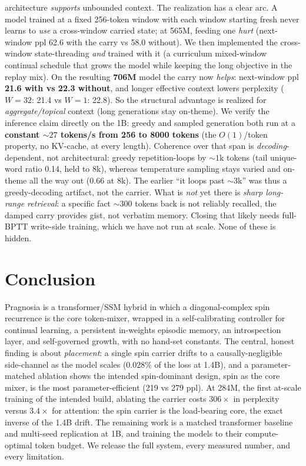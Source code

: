 \documentclass[11pt]{article}
\begin{document}
architecture \emph{supports} unbounded context. The realization has a clear arc. A model trained at a fixed 256-token window with each window starting fresh never learns to \emph{use} a cross-window carried state; at 565M, feeding one \emph{hurt} (next-window ppl 62.6 with the carry vs 58.0 without). We then implemented the cross-window state-threading \emph{and} trained with it (a curriculum mixed-window continual schedule that grows the model while keeping the long objective in the replay mix). On the resulting \textbf{706M} model the carry now \emph{helps}: next-window ppl \textbf{21.6 with vs 22.3 without}, and longer effective context lowers perplexity ($W{=}32$: 21.4 vs $W{=}1$: 22.8). So the structural advantage is realized for \emph{aggregate/topical} context (long generations stay on-theme). We verify the inference claim directly on the 1B: greedy and sampled generation both run at a \textbf{constant ${\sim}27$ tokens/s from 256 to 8000 tokens} (the $O(1)$/token property, no KV-cache, at every length). Coherence over that span is \emph{decoding}-dependent, not architectural: greedy repetition-loops by ${\sim}1$k tokens (tail unique-word ratio 0.14, held to 8k), whereas temperature sampling stays varied and on-theme all the way out (0.66 at 8k). The earlier ``it loops past ${\sim}3$k'' was thus a greedy-decoding artifact, not the carrier. What is \emph{not} yet there is \emph{sharp long-range retrieval}: a specific fact ${\sim}300$ tokens back is not reliably recalled, the damped carry provides gist, not verbatim memory. Closing that likely needs full-BPTT write-side training, which we have not run at scale. None of these is hidden.

\section{Conclusion}
Pragnosia is a transformer/SSM hybrid in which a diagonal-complex spin recurrence is the core token-mixer, wrapped in a self-calibrating controller for continual learning, a persistent in-weights episodic memory, an introspection layer, and self-governed growth, with no hand-set constants. The central, honest finding is about \emph{placement}: a single spin carrier drifts to a causally-negligible side-channel as the model scales (0.028\% of the loss at 1.4B), and a parameter-matched ablation shows the intended spin-dominant design, spin as the core mixer, is the most parameter-efficient (219 vs 279 ppl). At 284M, the first at-scale training of the intended build, ablating the carrier costs \textbf{$306\times$} in perplexity versus $3.4\times$ for attention: the spin carrier is the load-bearing core, the exact inverse of the 1.4B drift. The remaining work is a matched transformer baseline and multi-seed replication at 1B, and training the models to their compute-optimal token budget. We release the full system, every measured number, and every limitation.



\end{document}
